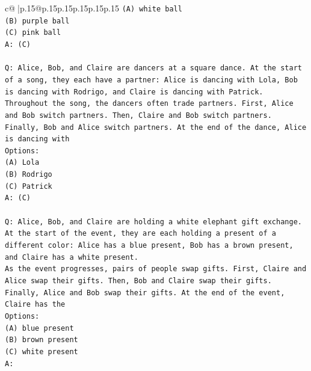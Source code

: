 \documentclass{article}
\begin{document}
{\begin{supertabular}{c@{$\;$}|p{.15\linewidth}@{}p{.15\linewidth}p{.15\linewidth}p{.15\linewidth}p{.15\linewidth}p{.15\linewidth}}
{{{\texttt{(A) white ball} \\
\texttt{(B) purple ball} \\
\texttt{(C) pink ball} \\
\texttt{A: (C)} \\
\\ 
\texttt{Q: Alice, Bob, and Claire are dancers at a square dance. At the start of a song, they each have a partner: Alice is dancing with Lola, Bob is dancing with Rodrigo, and Claire is dancing with Patrick.} \\
\texttt{Throughout the song, the dancers often trade partners. First, Alice and Bob switch partners. Then, Claire and Bob switch partners. Finally, Bob and Alice switch partners. At the end of the dance, Alice is dancing with} \\
\texttt{Options:} \\
\texttt{(A) Lola} \\
\texttt{(B) Rodrigo} \\
\texttt{(C) Patrick} \\
\texttt{A: (C)} \\
\\ 
\texttt{Q: Alice, Bob, and Claire are holding a white elephant gift exchange. At the start of the event, they are each holding a present of a different color: Alice has a blue present, Bob has a brown present, and Claire has a white present.} \\
\texttt{As the event progresses, pairs of people swap gifts. First, Claire and Alice swap their gifts. Then, Bob and Claire swap their gifts. Finally, Alice and Bob swap their gifts. At the end of the event, Claire has the} \\
\texttt{Options:} \\
\texttt{(A) blue present} \\
\texttt{(B) brown present} \\
\texttt{(C) white present} \\
\texttt{A:} \\
            }
        }
    }
     \\ \\


\end{supertabular}}
\end{document}
